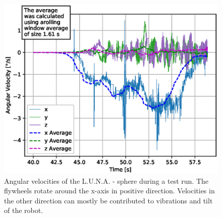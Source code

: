 \begin{figure}
\centering
\includegraphics[width=\textwidth]{./plotsAndScripts/angVel-2020-01-29-16-14-54/ang-vel}
\caption{Angular velocities of the L.U.N.A. - sphere during a test run. The flywheels rotate around the x-axis in positive direction. Velocities in the other direction can mostly be contributed to vibrations and tilt of the robot.}
\label{sec:experimentalResults:COAMDrive:fig:angvel}
\end{figure}